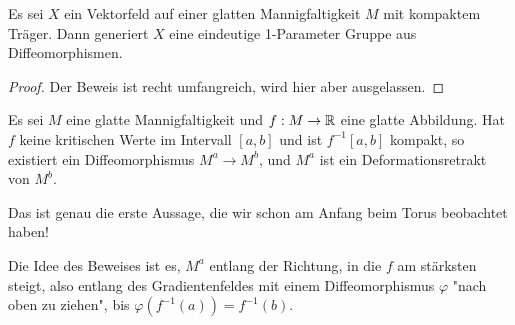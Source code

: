 \begin{lemma}
    \label{lemma:generierende vektorfelder}
    Es sei $X$ ein Vektorfeld auf einer glatten Mannigfaltigkeit $M$ mit kompaktem 
    Träger. Dann generiert $X$ eine eindeutige 1-Parameter Gruppe aus 
    Diffeomorphismen.
\end{lemma}

\begin{proof} Der Beweis ist recht umfangreich, wird hier aber ausgelassen. \end{proof}

\begin{theorem}
    \label{theorem:erstes deformationslemma}
    Es sei $M$ eine glatte Mannigfaltigkeit und $f: M \rightarrow { \mathbb R }$ eine
    glatte Abbildung. Hat $f$ keine kritischen Werte im Intervall $[a, b]$ und 
    ist $f^{-1}[a, b]$ kompakt, so existiert ein Diffeomorphismus 
    $M^a \rightarrow M^b$, und $M^a$ ist ein Deformationsretrakt von $M^b$.
\end{theorem}

Das ist genau die erste Aussage, die wir schon am Anfang beim Torus beobachtet 
haben!

Die Idee des Beweises ist es, $M^a$ entlang der Richtung, in die $f$ am stärksten
steigt, also entlang des Gradientenfeldes mit einem Diffeomorphismus $\varphi$ 
"nach oben zu ziehen", bis $\varphi(f^{-1}(a)) = f^{-1}(b)$.

